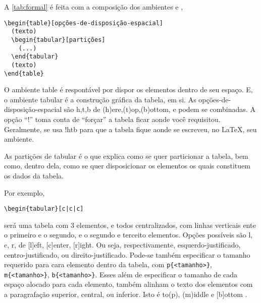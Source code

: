 \documentclass[12pt,
brazilian,
a5paper]{abntex2} %
\begin{document}
{            \vspace{3mm} %

            \clearpage

            \noident A \autoref{tab:formal} é feita com a composição dos ambientes
            {} e {},

\begin{verbatim}
\begin{table}[opções-de-disposição-espacial]
  (texto)
  \begin{tabular}[partições]
    (...)
  \end{tabular}
  (texto)
\end{table}
\end{verbatim}

            O ambiente table é respontável por dispor os elementos dentro de seu
            espaço. E, o ambiente tabular é a construção gráfica da tabela, em
            si. As opções-de-disposição-espacial são h,t,b de
            (h)ere,(t)op,(b)ottom, e podem se combinadas. A opção ``!'' toma conta
            de ``forçar'' a tabela ficar aonde você requisitou. Geralmente, se usa
            !htb para que a tabela fique aonde se escreveu, no \LaTeX{}, seu
            ambiente.

            As partições de tabular é o que explica como se quer particionar a
            tabela, bem como, dentro dela, como se quer disposicionar os elementos
            os quais constituem os dados da tabela.

            Por exemplo,

\begin{verbatim}\begin{tabular}[c|c|c]\end{verbatim}

 será uma tabela com 3 elementos, e todos centralizados, com linhas verticais ente o primeiro e o segundo, e o
                    segundo e terceito elementos. Opções possíveis são l, c, r, de [l]eft, [c]enter,
                    [r]ight. Ou seja, respectivamente, esquerdo-justificado,
                    centro-justificado, ou direito-justificado. Pode-se também especificar
                    o tamanho requerido para cara elemento dentro da
                    tabela, com \verb+p{<tamanho>}+,
                    \verb+m{<tamanho>}+, \verb+b{<tamanho>}+. Esses
                    além de especificar o tamanho de cada espaço alocado para cada
                    elemento, também alinham o texto dos elementos com a
                    paragrafação superior, central, ou inferior. Isto é to(p),
                    (m)iddle e [b]ottom \cite{wiki2015}.

}
\end{document}
